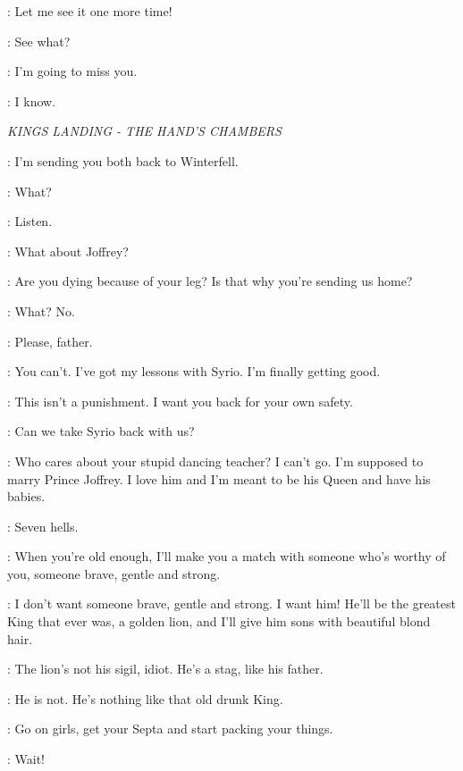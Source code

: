 \THEON:  Let me see it one more time! 

\ROS:  See what? 


\THEON:  I'm going to miss you. 

\ROS:  I know. 


\scene

\textit{KINGS LANDING - THE HAND'S CHAMBERS} 


\NED:  I'm sending you both back to Winterfell. 

\SANSA:  What? 

\NED:  Listen. 

\SANSA:  What about Joffrey? 

\ARYA:  Are you dying because of your leg? Is that why you're sending us home? 

\NED:  What? No. 

\SANSA:  Please, father. 

\ARYA:  You can't. I've got my lessons with Syrio. I'm finally getting good. 

\NED:  This isn't a punishment. I want you back for your own safety. 

\ARYA:  Can we take Syrio back with us? 

\SANSA:  Who cares about your stupid dancing teacher? I can't go. I'm supposed to marry Prince Joffrey. I love him and I'm meant to be his Queen and have his babies. 

\ARYA:  Seven hells. 

\NED:  When you're old enough, I'll make you a match with someone who's worthy of you, someone brave, gentle and strong.

\SANSA:  I don't want someone brave, gentle and strong. I want him!  He'll be the greatest King that ever was, a golden lion, and I'll give him sons with beautiful blond hair. 

\ARYA:  The lion's not his sigil, idiot.  He's a stag, like his father. 

\SANSA:  He is not. He's nothing like that old drunk King. 

\NED:  Go on girls, get your Septa and start packing your things.

\SANSA: Wait! 

